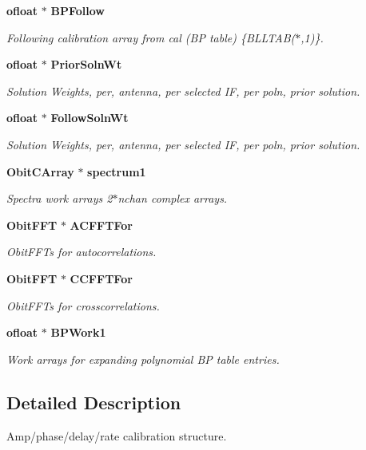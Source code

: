 \begin{CompactItemize}
{\bf ofloat} $\ast$ {\bf BPFollow}
\begin{CompactList}\small\item\em Following calibration array from cal (BP table) \{BLLTAB($\ast$,1)\}. \item\end{CompactList}\item 
{\bf ofloat} $\ast$ {\bf Prior\-Soln\-Wt}
\begin{CompactList}\small\item\em Solution Weights, per, antenna, per selected IF, per poln, prior solution. \item\end{CompactList}\item 
{\bf ofloat} $\ast$ {\bf Follow\-Soln\-Wt}
\begin{CompactList}\small\item\em Solution Weights, per, antenna, per selected IF, per poln, prior solution. \item\end{CompactList}\item 
{\bf Obit\-CArray} $\ast$ {\bf spectrum1}
\begin{CompactList}\small\item\em Spectra work arrays 2$\ast$nchan complex arrays. \item\end{CompactList}\item 
{\bf Obit\-FFT} $\ast$ {\bf ACFFTFor}
\begin{CompactList}\small\item\em Obit\-FFTs for autocorrelations. \item\end{CompactList}\item 
{\bf Obit\-FFT} $\ast$ {\bf CCFFTFor}
\begin{CompactList}\small\item\em Obit\-FFTs for crosscorrelations. \item\end{CompactList}\item 
{\bf ofloat} $\ast$ {\bf BPWork1}
\begin{CompactList}\small\item\em Work arrays for expanding polynomial BP table entries. \item\end{CompactList}\end{CompactItemize}


\subsection{Detailed Description}
Amp/phase/delay/rate calibration structure. 



